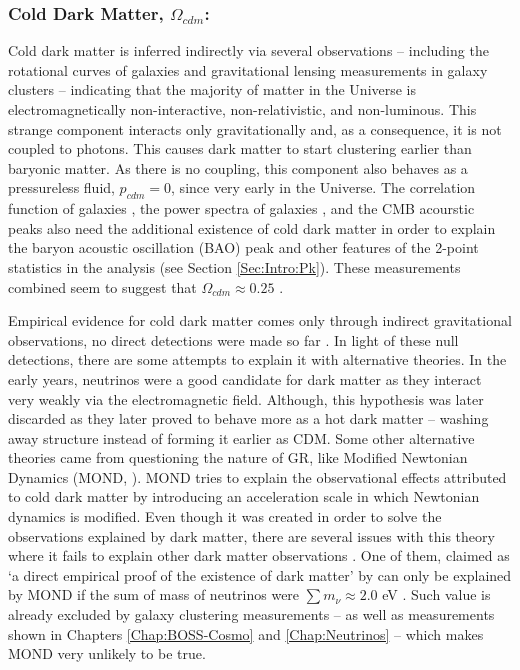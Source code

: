\subsubsection{Cold Dark Matter, $\Omega_{cdm}$:}
Cold dark matter is inferred indirectly via several observations -- including the rotational curves of galaxies \citep{1970Rubin} and gravitational lensing measurements in galaxy clusters \citep{2006BulletCluster} -- indicating that the majority of matter in the Universe is electromagnetically non-interactive, non-relativistic, and non-luminous. This strange component interacts only gravitationally and, as a consequence, it is not coupled to photons. This causes dark matter to start clustering earlier than baryonic matter. As there is no coupling, this component also behaves as a pressureless fluid, $p_{cdm} = 0$, since very early in the Universe. The correlation function of galaxies \citep{Einsenstein2005}, the power spectra of galaxies \citep{Blake2007,BOSS}, and the CMB acourstic peaks \citep{PlanckCosmology2016,PlanckResults2015,2018PlanckCosmology} also need the additional existence of cold dark matter in order to explain the baryon acoustic oscillation (BAO) peak and other features of the 2-point statistics in the analysis (see Section \ref{Sec:Intro:Pk}). These measurements combined seem to suggest that $\Omega_{cdm} \approx 0.25$ .

\qquad Empirical evidence for cold dark matter comes only through indirect gravitational observations, no direct detections were made so far \citep{2017DarkMatterExpReview}. In light of these null detections, there are some attempts to explain it with alternative theories. In the early years, neutrinos were a good candidate for dark matter as they interact very weakly via the electromagnetic field. Although, this hypothesis was later discarded as they later proved to behave more as a hot dark matter -- washing away structure instead of forming it earlier as CDM. Some other alternative theories came from questioning the nature of GR, like Modified Newtonian Dynamics (MOND, \citealt{1983MOND}). MOND tries to explain the observational effects attributed to cold dark matter by introducing an acceleration scale in which Newtonian dynamics is modified. Even though it was created in order to solve the observations explained by dark matter, there are several issues with this theory where it fails to explain other dark matter observations \citep{2011MondSucks}. One of them, claimed as `a direct empirical proof of the existence of dark matter' by \cite{2006BulletCluster} can only be explained by MOND if the sum of mass of neutrinos were $\sum m_{\nu} \approx 2.0$ eV \citep{2007ApJ...654L..13A}. Such value is already excluded by galaxy clustering measurements -- \citealt{Thomas2010Neutr,2014Gonzalez-GarciaNeutrino} as well as measurements shown in Chapters \ref{Chap:BOSS-Cosmo} and \ref{Chap:Neutrinos} -- which makes MOND very unlikely to be true.  

